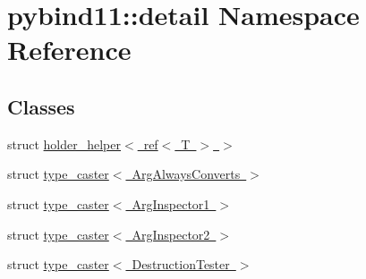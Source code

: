 \hypertarget{namespacepybind11_1_1detail}{}\section{pybind11\+::detail Namespace Reference}
\label{namespacepybind11_1_1detail}
\subsection*{Classes}
\begin{DoxyCompactItemize}
\item 
struct \mbox{\hyperlink{structpybind11_1_1detail_1_1holder__helper_3_01ref_3_01_t_01_4_01_4}{holder\+\_\+helper$<$ ref$<$ T $>$ $>$}}
\item 
struct \mbox{\hyperlink{structpybind11_1_1detail_1_1type__caster_3_01_arg_always_converts_01_4}{type\+\_\+caster$<$ Arg\+Always\+Converts $>$}}
\item 
struct \mbox{\hyperlink{structpybind11_1_1detail_1_1type__caster_3_01_arg_inspector1_01_4}{type\+\_\+caster$<$ Arg\+Inspector1 $>$}}
\item 
struct \mbox{\hyperlink{structpybind11_1_1detail_1_1type__caster_3_01_arg_inspector2_01_4}{type\+\_\+caster$<$ Arg\+Inspector2 $>$}}
\item 
struct \mbox{\hyperlink{structpybind11_1_1detail_1_1type__caster_3_01_destruction_tester_01_4}{type\+\_\+caster$<$ Destruction\+Tester $>$}}
\end{DoxyCompactItemize}
